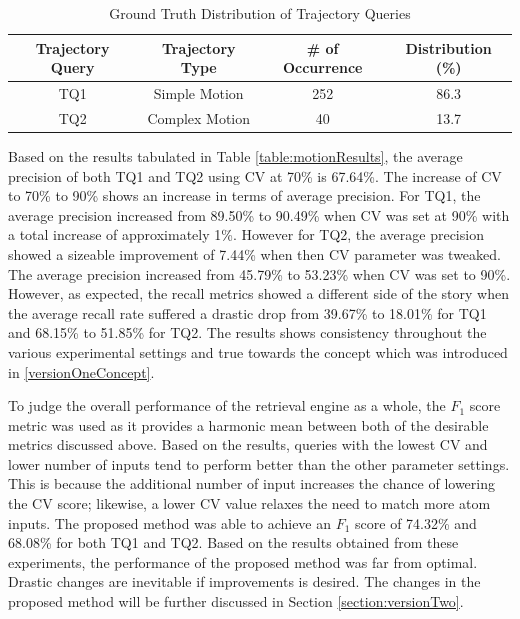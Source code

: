 \begin{table}[bht!]
\centering
\caption{Ground Truth Distribution of Trajectory Queries}
\label{table:motiondist}
\begin{tabular}{cccc}
\toprule
Trajectory Query &  Trajectory Type & \# of Occurrence & Distribution (\%)   \\
\midrule
TQ1       & Simple Motion       & 252 & 86.3   \\
TQ2      & Complex Motion       & 40 & 13.7  \\
\bottomrule
\end{tabular}
\end{table}

Based on the results tabulated in Table \ref{table:motionResults}, the average
precision of both TQ1 and TQ2 using CV at 70\% is 67.64\%. The increase of CV
to 70\% to 90\% shows an increase in terms of average precision. For TQ1, the
average precision increased from 89.50\% to 90.49\% when CV was set at 90\%
with a total increase of approximately 1\%. However for TQ2, the average
precision showed a sizeable improvement of 7.44\% when then CV parameter was
tweaked. The average precision increased from 45.79\% to 53.23\% when CV was
set to 90\%.
However, as expected, the recall metrics showed a different side of the story
when the average recall rate suffered a drastic drop from 39.67\% to 18.01\%
for TQ1 and 68.15\% to 51.85\% for TQ2. The results shows consistency
throughout the various experimental settings and true towards the concept which
was introduced in \ref{versionOneConcept}.

To judge the overall performance of the retrieval engine as a whole, the $F_1$
score metric was used as it provides a harmonic mean between both of the
desirable metrics discussed above. Based on the results, queries with the lowest
CV and lower number of inputs tend to perform better than the other parameter
settings.
This is because the additional number of input increases the chance of lowering
the CV score; likewise, a lower CV value relaxes the need to match more atom
inputs.
The proposed method was able to achieve an $F_1$ score of 74.32\% and 68.08\%
for both TQ1 and TQ2.
Based on the results obtained from these experiments, the performance of the
proposed method was far from optimal. Drastic changes are inevitable if
improvements is desired. The changes in the proposed method will be further
discussed in Section \ref{section:versionTwo}.


